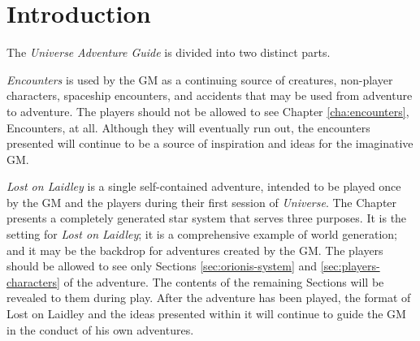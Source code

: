 \section*{Introduction}
\label{sec:introduction}

The \emph{Universe} \emph{Adventure Guide} is divided into two
distinct parts.

\emph{Encounters} is used by the GM as a continuing source of
creatures, non-player characters, spaceship encounters, and accidents
that may be used from adventure to adventure. The players should not
be allowed to see Chapter \ref{cha:encounters}, Encounters, at all.
Although they will eventually run out, the encounters presented will
continue to be a source of inspiration and ideas for the imaginative
GM.

\emph{Lost on Laidley} is a single self-contained adventure, intended
to be played once by the GM and the players during their first session
of \emph{Universe}. The Chapter presents a completely generated star
system that serves three purposes. It is the setting for \emph{Lost on
  Laidley}; it is a comprehensive example of world generation; and it
may be the backdrop for adventures created by the GM. The players
should be allowed to see only Sections \ref{sec:orionis-system} and
\ref{sec:players-characters} of the adventure. The contents of the
remaining Sections will be revealed to them during play.  After the
adventure has been played, the format of Lost on Laidley and the ideas
presented within it will continue to guide the GM in the conduct of
his own adventures.

